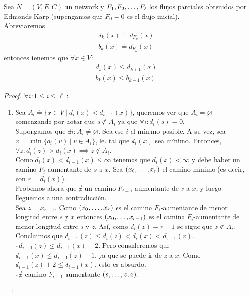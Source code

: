 \begin{lemma}\label{distancias_no_decrecen_EK}
Sea $N=(V,E,C)$ un network y $F_1, F_2, \mathellipsis, F_\ell$ los flujos parciales obtenidos por Edmonds-Karp (supongamos que $F_0 = 0$ es el flujo inicial).\\
Abreviaremos
\begin{align}
    d_k(x) \doteq d_{F_k}(x) \\
    b_k(x) \doteq d_{F_k}(x)
\end{align} entonces tenemos que $\forall x \in V$:
\begin{align}
    d_k(x) \le d_{k+1}(x) \\
    b_k(x) \le b_{k+1}(x)
\end{align}
\end{lemma}

\begin{proof}
$\forall i : 1 \le i \le \ell$ :\\
\begin{enumerate}
    \item
    Sea $A_i \doteq \{x \in V \mid d_i(x) < d_{i-1}(x)\}$, queremos ver que $A_i = \varnothing$ comenzando por notar que $s \notin A_i$ ya que $\forall i: d_i(s) = 0$.\\
    Supongamos que $\exists i : A_i \neq \varnothing$. Sea ese $i$ el mínimo posible. A su vez, sea $x = \min\{d_i(v) \mid v \in A_i \}$, ie. tal que $d_i(x)$ sea mínimo. Entonces, $\forall z : d_i(z) > d_i(x) \implies z\notin A_i$.\\
    Como $d_i(x) < d_{i-1}(x) \le \infty$ tenemos que $d_i(x) < \infty$ y debe haber un camino $F_i$-aumentante de $s$ a $x$. Sea $(x_0, \mathellipsis, x_r)$ el camino mínimo (es decir, con $r = d_i(x)$).\\
    Probemos ahora que $\nexists$ un camino $F_{i-1}$-aumentante de $s$ a $x$, y luego lleguemos a una contradicción.\\
    Sea $z = x_{r-1}$. Como $(x_0,\mathellipsis, x_r)$ es el camino $F_i$-aumentante de menor longitud entre $s$ y $x$ entonces $(x_0, \mathellipsis, x_{r-1})$ es el camino $F_{i}$-aumentante de menor longitud entre $s$ y $z$. Así, como $d_i(z) = r-1$ se sigue que $z \notin A_i$. Concluimos que $d_{i-1}(z) \le d_i(z) < d_i(x) < d_{i-1}(x)$. \\
    $\therefore d_{i-1}(z) \le d_{i-1}(x)-2$.
    Pero consideremos que $d_{i-1}(x) \le d_{i-1}(z) + 1$, ya que se puede ir de $z$ a $x$.
    Como $d_{i-1}(z)+2 \le d_{i-1}(x)$, esto es absurdo.\\
    $\therefore \nexists$ camino $F_{i-1}$-aumentante $(s,\mathellipsis, z, x).$\\

\end{enumerate}
\end{proof}
